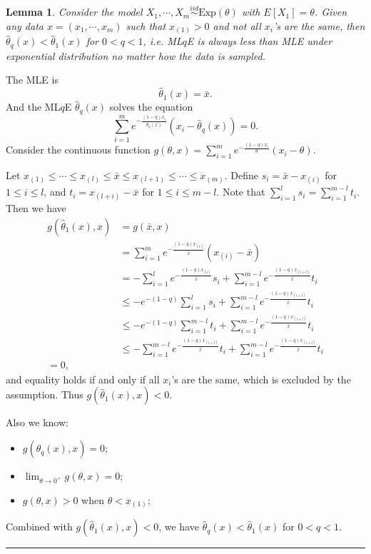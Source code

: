 \documentclass[a4paper]{article}
\newenvironment{proof}{{\bf Proof:  }}{\hfill\rule{2mm}{2mm}}
\newtheorem{lemma}[fact]{Lemma}
\begin{document}
\begin{lemma}
\label{lemma:LqlMLE}
Consider the model $X_1, \cdots, X_m \stackrel{iid}{\sim} \mathrm{Exp}(\theta)$ with $E[X_1] = \theta$. Given any data $x = (x_1, \cdots, x_m)$ such that $x_{(1)} > 0$ and not all $x_i$'s are the same, then $\hat{\theta}_q(x) < \hat{\theta}_1(x)$ for $0 < q < 1$, i.e. ML$q$E \cite{ferrari2010, qin2013maximum} is always less than MLE under exponential distribution no matter how the data is sampled.
\end{lemma}
\begin{proof}
The MLE is
\[
	\hat{\theta}_1(x) = \bar{x}.
\]
And the ML$q$E $\hat{\theta}_q(x)$ solves the equation
\[
	\sum_{i=1}^m e^{-\frac{(1-q)x_i}{\hat{\theta}_q(x)}}(x_i - \hat{\theta}_q(x)) = 0.
\]
Consider the continuous function $g(\theta, x) = \sum_{i=1}^m e^{-\frac{(1-q)x_i}{\theta}}(x_i - \theta)$. 

Let $x_{(1)} \le \cdots \le x_{(l)} \le \bar{x} \le x_{(l+1)} \le \cdots \le x_{(m)}$. Define $s_i = \bar{x} - x_{(i)}$ for $1 \le i \le l$, and $t_{i} = x_{(l+i)} - \bar{x}$ for $1 \le i \le m - l$. Note that $\sum_{i=1}^l s_i = \sum_{i=1}^{m-l} t_i$. Then we have
\begin{align*}
g(\hat{\theta}_1(x), x) & = g(\bar{x}, x) \\
& = \sum_{i=1}^m e^{-\frac{(1-q)x_{(i)}}{\bar{x}}}(x_{(i)} - \bar{x}) \\
& = - \sum_{i=1}^l e^{-\frac{(1-q)x_{(i)}}{\bar{x}}}s_i
+ \sum_{i=1}^{m-l} e^{-\frac{(1-q)x_{(i+l)}}{\bar{x}}}t_i\\
& \le - e^{-(1-q)} \sum_{i=1}^l s_i
+ \sum_{i=1}^{m-l} e^{-\frac{(1-q)x_{(i+l)}}{\bar{x}}}t_i\\
& \le - e^{-(1-q)} \sum_{i=1}^{m-l} t_i
+ \sum_{i=1}^{m-l} e^{-\frac{(1-q)x_{(i+l)}}{\bar{x}}}t_i\\
& \le - \sum_{i=1}^{m-l} e^{-\frac{(1-q)x_{(i+l)}}{\bar{x}}}t_i
+ \sum_{i=1}^{m-l} e^{-\frac{(1-q)x_{(i+l)}}{\bar{x}}}t_i\\
= 0,
\end{align*}
and equality holds if and only if all $x_i$'s are the same, which is excluded by the assumption.
Thus $g(\hat{\theta}_1(x), x) < 0$.

Also we know:
\begin{itemize}
\item $g(\hat{\theta}_q(x), x) = 0$;
\item $\lim_{\theta \rightarrow 0^+}g(\theta, x) = 0$;
\item $g(\theta, x) > 0$ when $\theta < x_{(1)}$;
\end{itemize}
Combined with $g(\hat{\theta}_1(x), x) < 0$, we have $\hat{\theta}_q(x) < \hat{\theta}_1(x)$ for $0 < q < 1$.
\end{proof}
\end{document}
